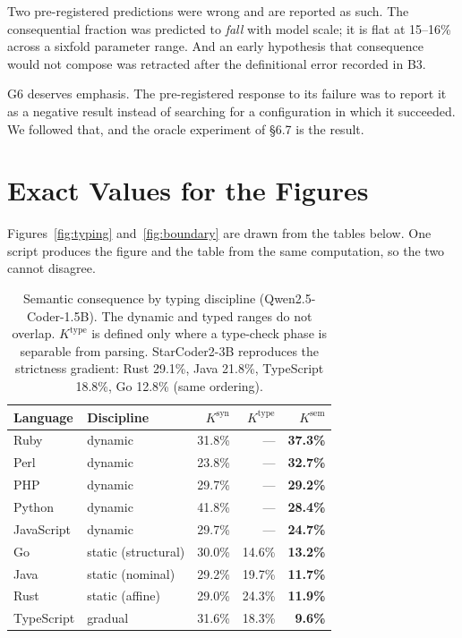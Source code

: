 Two pre-registered predictions were wrong and are reported as such. The consequential fraction was
predicted to \emph{fall} with model scale; it is flat at 15--16\% across a sixfold parameter range.
And an early hypothesis that consequence would not compose was retracted after the definitional
error recorded in B3.

G6 deserves emphasis. The pre-registered response to its failure was to report it as a negative
result instead of searching for a configuration in which it succeeded. We followed that, and the
oracle experiment of \S6.7 is the result.


\section{Exact Values for the Figures}
\label{app:figvalues}

Figures~\ref{fig:typing} and~\ref{fig:boundary} are drawn from the tables below. One script
produces the figure and the table from the same computation, so the two cannot disagree.

\begin{table}[H]
\centering
\begin{tabular}{llrrr}
\toprule
Language & Discipline & $K^{\mathrm{syn}}$ & $K^{\mathrm{type}}$ & $K^{\mathrm{sem}}$ \\
\midrule
Ruby       & dynamic & 31.8\% & --- & \textbf{37.3\%} \\
Perl       & dynamic & 23.8\% & --- & \textbf{32.7\%} \\
PHP        & dynamic & 29.7\% & --- & \textbf{29.2\%} \\
Python     & dynamic & 41.8\% & --- & \textbf{28.4\%} \\
JavaScript & dynamic & 29.7\% & --- & \textbf{24.7\%} \\
\midrule
Go         & static (structural) & 30.0\% & 14.6\% & \textbf{13.2\%} \\
Java       & static (nominal)    & 29.2\% & 19.7\% & \textbf{11.7\%} \\
Rust       & static (affine)     & 29.0\% & 24.3\% & \textbf{11.9\%} \\
TypeScript & gradual             & 31.6\% & 18.3\% & \textbf{9.6\%} \\
\bottomrule
\end{tabular}
\caption{Semantic consequence by typing discipline (Qwen2.5-Coder-1.5B). The dynamic and typed
ranges do not overlap. $K^{\mathrm{type}}$ is defined only where a type-check phase is separable
from parsing. StarCoder2-3B reproduces the strictness gradient: Rust 29.1\%, Java 21.8\%,
TypeScript 18.8\%, Go 12.8\% (same ordering).}
\label{tab:typing}
\end{table}

